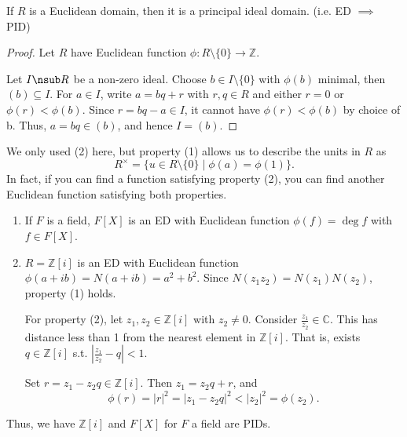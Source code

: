 \begin{proposition}
    If \(R\) is a Euclidean domain, then it is a principal ideal domain. (i.e. ED \(\implies\) PID)
\end{proposition}
\begin{proof}
    Let \(R\) have Euclidean function \(\phi: R \setminus \{0\}\to \mathbb{Z}\).

    Let \(I \nsub R\) be a non-zero ideal. Choose \(b \in I\setminus \{0\}\) with \(\phi(b)\) minimal, then \((b) \subseteq I\). For \(a \in I\), write \(a = bq + r\) with \(r,q \in R\) and either \(r = 0\) or \(\phi(r) < \phi(b)\). Since \(r = bq - a \in I\), it cannot have \(\phi(r) < \phi(b)\) by choice of b. Thus, \(a = bq \in (b)\), and hence \(I = (b)\).
\end{proof}
\begin{remark}
    We only used (2) here, but property (1) allows us to describe the units in \(R\) as
    \[
        R^\times = \{u \in R\setminus \{0\} \mid \phi(a) = \phi(1)\}.
    \]
    In fact, if you can find a function satisfying property (2), you can find another Euclidean function satisfying both properties.
\end{remark}
\begin{example}
    \leavevmode
    \begin{enumerate}
        \item If \(F\) is a field, \(F[X]\) is an ED with Euclidean function \(\phi(f) = \deg f\) with \(f \in F[X]\).
        \item \(R = \mathbb{Z}[i]\) is an ED with Euclidean function \(\phi(a + ib) = N(a + ib) = a^2 + b^2\). Since \(N(z_{1}z_2) = N(z_1)N(z_2)\), property (1) holds.
        
        For property (2), let \(z_1, z_2 \in \mathbb{Z}[i]\) with \(z_2 \neq 0\). Consider \(\frac{z_1}{z_2}\in \mathbb{C}\). This has distance less than 1 from the nearest element in \(\mathbb{Z}[i]\). That is, exists \(q \in \mathbb{Z}[i]\) s.t. \(\left\vert \frac{z_1}{z_2}-q \right\vert<1 \).

        Set \(r = z_1 - z_{2}q \in \mathbb{Z}[i]\). Then \(z_1 = z_2 q + r\), and
        \[
            \phi(r) = \left\vert r \right\vert^2 = \left\vert z_1 - z_2 q \right\vert^2 < \left\vert z_2 \right\vert^2 = \phi(z_2).
        \]
    \end{enumerate}
    Thus, we have \(\mathbb{Z}[i]\) and \(F[X]\) for \(F\) a field are PIDs.
\end{example}
